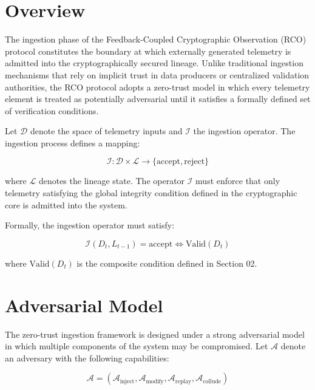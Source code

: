 \section{Overview}

The ingestion phase of the Feedback-Coupled Cryptographic Observation (RCO) protocol constitutes the boundary at which externally generated telemetry is admitted into the cryptographically secured lineage. Unlike traditional ingestion mechanisms that rely on implicit trust in data producers or centralized validation authorities, the RCO protocol adopts a zero-trust model in which every telemetry element is treated as potentially adversarial until it satisfies a formally defined set of verification conditions.

Let $\mathcal{D}$ denote the space of telemetry inputs and $\mathcal{I}$ the ingestion operator. The ingestion process defines a mapping:

\begin{equation}
\mathcal{I}: \mathcal{D} \times \mathcal{L} \rightarrow \{\text{accept}, \text{reject}\}
\end{equation}

where $\mathcal{L}$ denotes the lineage state. The operator $\mathcal{I}$ must enforce that only telemetry satisfying the global integrity condition defined in the cryptographic core is admitted into the system.

Formally, the ingestion operator must satisfy:

\begin{equation}
\mathcal{I}(D_t, L_{t-1}) = \text{accept} \iff \text{Valid}(D_t)
\end{equation}

where $\text{Valid}(D_t)$ is the composite condition defined in Section 02.

\section{Adversarial Model}

The zero-trust ingestion framework is designed under a strong adversarial model in which multiple components of the system may be compromised. Let $\mathcal{A}$ denote an adversary with the following capabilities:

\begin{equation}
\mathcal{A} = (\mathcal{A}_{\text{inject}}, \mathcal{A}_{\text{modify}}, \mathcal{A}_{\text{replay}}, \mathcal{A}_{\text{collude}})
\end{equation}

